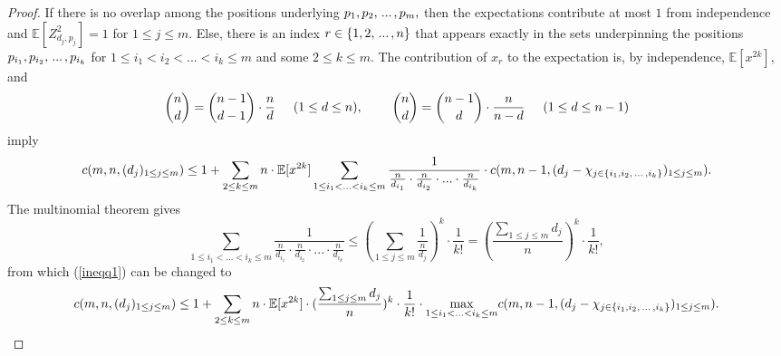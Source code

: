 \documentclass{article}
\numberwithin{equation}{section}
\begin{document}
\begin{proof}
    If there is no overlap among the positions underlying \(p_1,p_2,\hspace{0.05cm}...\hspace{0.05cm},p_m,\) then the expectations contribute at most \(1\) from independence and \(\mathbb{E}[Z^2_{d_j,p_j}]=1\) for \(1 \leq j \leq m.\) Else, there is an index \(r \in \{1,2,\hspace{0.05cm}...\hspace{0.05cm},n\}\) that appears exactly in the sets underpinning the positions \(p_{i_1},p_{i_2},\hspace{0.05cm}...\hspace{0.05cm},p_{i_k}\) for \(1 \leq i_1<i_2<...<i_k \leq m\) and some \(2 \leq k \leq m.\) The contribution of \(x_r\) to the expectation is, by independence, \(\mathbb{E}[x^{2k}],\) and
    \[\binom{n}{d}=\binom{n-1}{d-1} \cdot \frac{n}{d} \hspace{0.5cm} (1 \leq d \leq n), \hspace{0.8cm} \binom{n}{d}=\binom{n-1}{d} \cdot \frac{n}{n-d} \hspace{0.5cm} (1 \leq d \leq n-1)\]
    imply
    \begin{equation}\label{ineqq1}
        c(m,n,(d_j)_{1 \leq j \leq m}) \leq 1+\sum_{2 \leq k \leq m}{n \cdot \mathbb{E}[x^{2k}]\sum_{1 \leq i_1<...<i_k \leq m}{\frac{1}{\frac{n}{d_{i_1}} \cdot \frac{n}{d_{i_2}} \cdot ... \cdot \frac{n}{d_{i_k}}}} \cdot c(m,n-1,(d_j-\chi_{j \in \{i_1,i_2, \hspace{0.05cm}...\hspace{0.05cm},i_k\}})_{1 \leq j \leq m})}.
    \end{equation}
    The multinomial theorem gives 
    \[\sum_{1 \leq i_1<...<i_k \leq m}{\frac{1}{\frac{n}{d_{i_1}} \cdot \frac{n}{d_{i_2}} \cdot ... \cdot \frac{n}{d_{i_k}}}} \leq (\sum_{1 \leq j \leq m}{\frac{1}{\frac{n}{d_j}}})^k \cdot \frac{1}{k!}=(\frac{\sum_{1 \leq j \leq m}{d_j}}{n})^k \cdot \frac{1}{k!},\] 
    from which (\ref{ineqq1}) can be changed to
    \[c(m,n,(d_j)_{1 \leq j \leq m}) \leq 1+\sum_{2 \leq k \leq m}{n \cdot \mathbb{E}[x^{2k}] \cdot (\frac{\sum_{1 \leq j \leq m}{d_j}}{n})^k \cdot \frac{1}{k!} \cdot \max_{1 \leq i_1<...<i_k \leq m}}{c(m,n-1,(d_j-\chi_{j \in \{i_1,i_2, \hspace{0.05cm}...\hspace{0.05cm},i_k\}})_{1 \leq j \leq m})}.\]
    \par

\end{proof}
\end{document}
